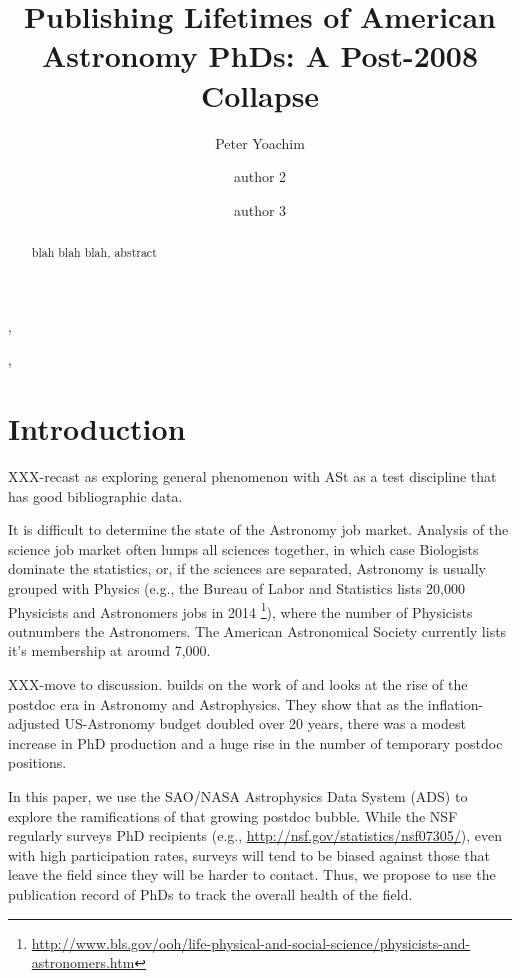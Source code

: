 \documentclass[preprint2]{aastex}
\begin{document}
\title{Publishing Lifetimes of American Astronomy PhDs: A Post-2008 Collapse}

\author{Peter Yoachim}, \author{author 2}, \author{author 3} 
  


\begin{abstract}
blah blah blah, abstract

\end{abstract}



\section{Introduction}

XXX-recast as exploring general phenomenon with ASt as a test discipline that has good bibliographic data.

It is difficult to determine the state of the Astronomy job market.  Analysis of the science job market often lumps all sciences together, in which case Biologists dominate the statistics, or, if the sciences are separated, Astronomy is usually grouped with Physics (e.g., the Bureau of Labor and Statistics lists 20,000 Physicists and Astronomers jobs in 2014 \footnote{\url{http://www.bls.gov/ooh/life-physical-and-social-science/physicists-and-astronomers.htm}}), where the number of Physicists outnumbers the Astronomers.  The American Astronomical Society currently lists it's membership at around 7,000.

XXX-move to discussion. \citet{Seth09} builds on the work of \citet{Metcalfe08} and looks at the rise of the postdoc era in Astronomy and Astrophysics.  They show that as the inflation-adjusted US-Astronomy budget doubled over 20 years, there was a modest increase in PhD production and a huge rise in the number of temporary postdoc positions.

In this paper, we use the SAO/NASA Astrophysics Data System (ADS) to explore the ramifications of that growing postdoc bubble.  While the NSF regularly surveys PhD recipients (e.g., \url{http://nsf.gov/statistics/nsf07305/}), even with high participation rates, surveys will tend to be biased against those that leave the field since they will be harder to contact.  Thus, we propose to use the publication record of PhDs to track the overall health of the field.  
\end{document}
